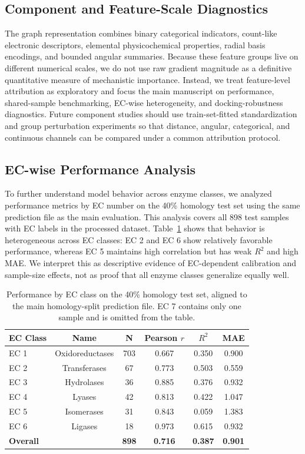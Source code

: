 \documentclass[11pt]{article}
\begin{document}
\subsection{Component and Feature-Scale Diagnostics}
\label{sec:ablation}

The graph representation combines binary categorical indicators, count-like electronic descriptors, elemental physicochemical properties, radial basis encodings, and bounded angular summaries. Because these feature groups live on different numerical scales, we do not use raw gradient magnitude as a definitive quantitative measure of mechanistic importance. Instead, we treat feature-level attribution as exploratory and focus the main manuscript on performance, shared-sample benchmarking, EC-wise heterogeneity, and docking-robustness diagnostics. Future component studies should use train-set-fitted standardization and group perturbation experiments so that distance, angular, categorical, and continuous channels can be compared under a common attribution protocol.

\subsection{EC-wise Performance Analysis}
\label{sec:ec_analysis}

To further understand model behavior across enzyme classes, we analyzed performance metrics by EC number on the 40\% homology test set using the same prediction file as the main evaluation. This analysis covers all 898 test samples with EC labels in the processed dataset. Table~\ref{tab:ec_wise} shows that behavior is heterogeneous across EC classes: EC 2 and EC 6 show relatively favorable performance, whereas EC 5 maintains high correlation but has weak $R^2$ and high MAE. We interpret this as descriptive evidence of EC-dependent calibration and sample-size effects, not as proof that all enzyme classes generalize equally well.

\begin{table}[h]
\centering
\caption{Performance by EC class on the 40\% homology test set, aligned to the main homology-split prediction file. EC 7 contains only one sample and is omitted from the table.}
\label{tab:ec_wise}
\begin{tabular}{lccccc}
\toprule
EC Class & Name & N & Pearson $r$ & $R^2$ & MAE \\
\midrule
EC 1 & Oxidoreductases & 703 & 0.667 & 0.350 & 0.900 \\
EC 2 & Transferases & 67 & 0.773 & 0.503 & 0.559 \\
EC 3 & Hydrolases & 36 & 0.885 & 0.376 & 0.932 \\
EC 4 & Lyases & 42 & 0.813 & 0.422 & 1.047 \\
EC 5 & Isomerases & 31 & 0.843 & 0.059 & 1.383 \\
EC 6 & Ligases & 18 & 0.973 & 0.615 & 0.932 \\
\midrule
\textbf{Overall} & & \textbf{898} & \textbf{0.716} & \textbf{0.387} & \textbf{0.901} \\
\bottomrule
\end{tabular}
\end{table}
\end{document}
